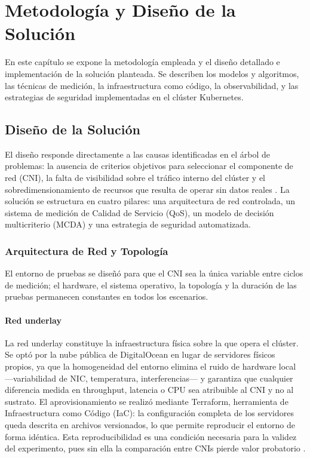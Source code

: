 \chapter{Metodología y Diseño de la Solución} \label{sec:Metodos}

En este capítulo se expone la metodología empleada y el diseño detallado e implementación de la solución planteada. Se describen los modelos y algoritmos, las técnicas de medición, la infraestructura como código, la observabilidad, y las estrategias de seguridad implementadas en el clúster Kubernetes.

\section{Diseño de la Solución}

El diseño responde directamente a las causas identificadas en el árbol de problemas: la ausencia de criterios objetivos para seleccionar el componente de red (CNI), la falta de visibilidad sobre el tráfico interno del clúster y el sobredimensionamiento de recursos que resulta de operar sin datos reales \cite{ref29}. La solución se estructura en cuatro pilares: una arquitectura de red controlada, un sistema de medición de Calidad de Servicio (QoS), un modelo de decisión multicriterio (MCDA) y una estrategia de seguridad automatizada.

\subsection{Arquitectura de Red y Topología}

El entorno de pruebas se diseñó para que el CNI sea la única variable entre ciclos de medición; el hardware, el sistema operativo, la topología y la duración de las pruebas permanecen constantes en todos los escenarios.

\subsubsection{Red underlay}

La red underlay constituye la infraestructura física sobre la que opera el clúster. Se optó por la nube pública de DigitalOcean en lugar de servidores físicos propios, ya que la homogeneidad del entorno elimina el ruido de hardware local ---variabilidad de NIC, temperatura, interferencias--- y garantiza que cualquier diferencia medida en throughput, latencia o CPU sea atribuible al CNI y no al sustrato. El aprovisionamiento se realizó mediante Terraform, herramienta de Infraestructura como Código (IaC): la configuración completa de los servidores queda descrita en archivos versionados, lo que permite reproducir el entorno de forma idéntica. Esta reproducibilidad es una condición necesaria para la validez del experimento, pues sin ella la comparación entre CNIs pierde valor probatorio \cite{ref7}.

